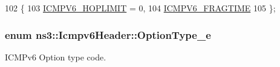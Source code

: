 \begin{DoxyCode}
102   \{
103     \hyperlink{classns3_1_1Icmpv6Header_a643af752203ad4456f89d3d1ab49943aa2f477ba611ff7d0606adbca6c61e318d}{ICMPV6\_HOPLIMIT} = 0,
104     \hyperlink{classns3_1_1Icmpv6Header_a643af752203ad4456f89d3d1ab49943aa5798a6dc190dfc603258e1313a4266a1}{ICMPV6\_FRAGTIME}
105   \};
\end{DoxyCode}
\subsubsection[{\texorpdfstring{Option\+Type\+\_\+e}{OptionType_e}}]{\setlength{\rightskip}{0pt plus 5cm}enum {\bf ns3\+::\+Icmpv6\+Header\+::\+Option\+Type\+\_\+e}}\hypertarget{classns3_1_1Icmpv6Header_a1992e0e28c453f5e23b1ad55a49b7908}{}\label{classns3_1_1Icmpv6Header_a1992e0e28c453f5e23b1ad55a49b7908}


I\+C\+M\+Pv6 Option type code. 


